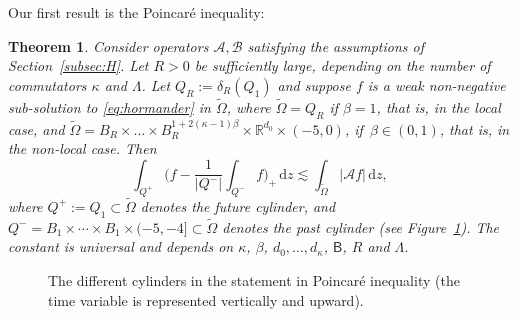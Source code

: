 \documentclass[10pt]{amsart}
\newtheorem{theorem}{Theorem}
\theoremstyle{definition}
\newcommand\R{{\mathbb R}}
\newcommand{\cA}{{\mathcal A}}
\newcommand{\cB}{{\mathcal B}}
\newcommand{\sB}{{\mathsf B}}
\newcommand{\dd}{{\, \mathrm d}}
\begin{document}
Our first result is the Poincaré inequality:
\begin{theorem}
\label{thm:poincare}
Consider operators $\cA, \cB$ satisfying the assumptions of Section~\ref{subsec:H}. Let $R >0$ be sufficiently large, depending on the
number of commutators $\kappa$ and $\Lambda$. Let \(Q_R :=\delta_R\left(Q_1\right)\)
and suppose $f$ is a weak non-negative sub-solution to
\eqref{eq:hormander} in $\tilde \Omega$, where $\tilde \Omega \!=\! Q_R$ if $\beta \!=\! 1$, that is, in the local case, and \(\tilde \Omega \!=\! B_R\!\times\! \dots \!\times\! B_R^{1 + 2(\kappa-1)\beta} \!\times\! \R^{d_0} \!\times\! (-5,0)\), if~$\beta \in (0, 1)$, that is, in the non-local case. Then
\begin{equation}
\label{eq:poincare}
\int_{Q^+} \biggl(f - \frac{1}{|Q^-|} \int_{Q^-}
f \biggr)_+ \dd z \lesssim
\int_{\tilde \Omega} \big\vert \cA f\big\vert \dd z,
\end{equation}
where $Q^+ \!:=\! Q_1 \!\subset\! \tilde \Omega$ denotes the future cylinder,
and
$Q^-\!=\!B_1 \!\times\! \cdots \!\times\! B_1\! \times (-5,-4] \!\subset\!
\tilde\Omega$ denotes the past cylinder (see
Figure~\ref{fig:main-result}).
The constant is universal and
depends on $\kappa$, $\beta$, $d_0,\dots,d_\kappa$, $\sB$, $R$
and $\Lambda$.
\end{theorem}

\begin{figure}[htb]
\centering


\caption{The different cylinders in the statement in Poincaré
inequality (the time variable is represented vertically and
upward).}\label{fig:main-result}
\end{figure}
\end{document}
